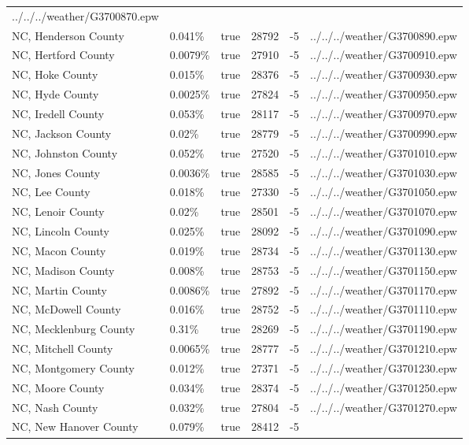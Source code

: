 \begin{longtable}[]{@{}llllll@{}}
../../../weather/G3700870.epw \\
NC, Henderson County & 0.041\% & true & 28792 & -5 &
../../../weather/G3700890.epw \\
NC, Hertford County & 0.0079\% & true & 27910 & -5 &
../../../weather/G3700910.epw \\
NC, Hoke County & 0.015\% & true & 28376 & -5 &
../../../weather/G3700930.epw \\
NC, Hyde County & 0.0025\% & true & 27824 & -5 &
../../../weather/G3700950.epw \\
NC, Iredell County & 0.053\% & true & 28117 & -5 &
../../../weather/G3700970.epw \\
NC, Jackson County & 0.02\% & true & 28779 & -5 &
../../../weather/G3700990.epw \\
NC, Johnston County & 0.052\% & true & 27520 & -5 &
../../../weather/G3701010.epw \\
NC, Jones County & 0.0036\% & true & 28585 & -5 &
../../../weather/G3701030.epw \\
NC, Lee County & 0.018\% & true & 27330 & -5 &
../../../weather/G3701050.epw \\
NC, Lenoir County & 0.02\% & true & 28501 & -5 &
../../../weather/G3701070.epw \\
NC, Lincoln County & 0.025\% & true & 28092 & -5 &
../../../weather/G3701090.epw \\
NC, Macon County & 0.019\% & true & 28734 & -5 &
../../../weather/G3701130.epw \\
NC, Madison County & 0.008\% & true & 28753 & -5 &
../../../weather/G3701150.epw \\
NC, Martin County & 0.0086\% & true & 27892 & -5 &
../../../weather/G3701170.epw \\
NC, McDowell County & 0.016\% & true & 28752 & -5 &
../../../weather/G3701110.epw \\
NC, Mecklenburg County & 0.31\% & true & 28269 & -5 &
../../../weather/G3701190.epw \\
NC, Mitchell County & 0.0065\% & true & 28777 & -5 &
../../../weather/G3701210.epw \\
NC, Montgomery County & 0.012\% & true & 27371 & -5 &
../../../weather/G3701230.epw \\
NC, Moore County & 0.034\% & true & 28374 & -5 &
../../../weather/G3701250.epw \\
NC, Nash County & 0.032\% & true & 27804 & -5 &
../../../weather/G3701270.epw \\
NC, New Hanover County & 0.079\% & true & 28412 & -5 &

\end{longtable}
